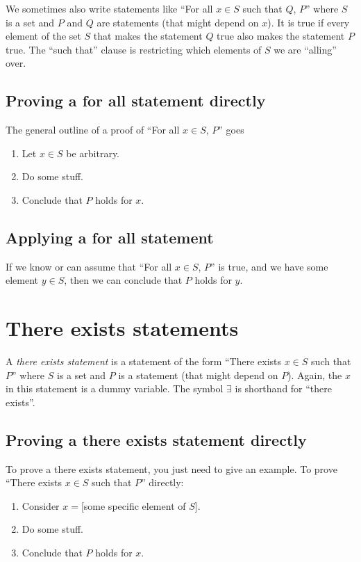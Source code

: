\documentclass[12pt]{amsart}
\begin{document}
We sometimes also write statements like ``For all $x\in S$ such that $Q$, $P$'' where $S$ is a set and $P$ and $Q$ are statements (that might depend on $x$). It is true if every element of the set $S$ that makes the statement $Q$ true also makes the statement $P$ true. The ``such that'' clause is restricting which elements of $S$ we are ``alling'' over.


\subsection*{Proving a for all statement directly} The general outline of a proof of ``For all $x\in S$, $P$'' goes
\begin{enumerate}
\item Let $x\in S$ be arbitrary.
\item Do some stuff.
\item Conclude that $P$ holds for $x$.
\end{enumerate}




\subsection*{Applying a for all statement} If we know or can assume that ``For all $x\in S$, $P$'' is true, and we have some element $y\in S$, then we can conclude that $P$ holds for $y$.

\section*{There exists statements} A \emph{there exists statement} is a statement of the form ``There exists $x\in S$ such that $P$'' where $S$ is a set and $P$ is a statement (that might depend on $P$). Again, the $x$ in this statement is a dummy variable. The symbol $\exists$ is shorthand for ``there exists''.

\subsection*{Proving a there exists statement directly} To prove a there exists statement, you just need to give an example. To prove ``There exists $x\in S$ such that $P$'' directly:
\begin{enumerate}
\item Consider $x=$[some specific element of $S$].
\item Do some stuff.
\item Conclude that $P$ holds for $x$.
\end{enumerate}
\end{document}
